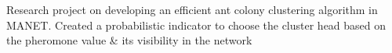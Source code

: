 \documentclass[]{resume-openfont}
\begin{document}
\begin{minipage}[t]{0.66\textwidth}
\descript{}\location{}
\begin{tightemize}
\item Research project on developing an efficient ant colony clustering algorithm in MANET. Created a probabilistic indicator to choose the cluster head based on the pheromone value \& its visibility in the network
\end{tightemize}
\sectionsep

\end{minipage} 
\end{document}
